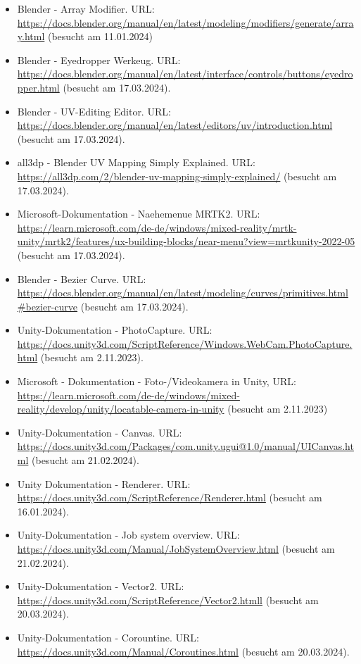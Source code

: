 \begin{itemize}[leftmargin=0pt]
    \item Blender - Array Modifier. {\scriptsize URL:} \url{https://docs.blender.org/manual/en/latest/modeling/modifiers/generate/array.html} (besucht am 11.01.2024)
    \item Blender - Eyedropper Werkeug. {\scriptsize URL:} \url{https://docs.blender.org/manual/en/latest/interface/controls/buttons/eyedropper.html} (besucht am 17.03.2024).
    \item Blender - UV-Editing Editor. {\scriptsize URL:} \url{https://docs.blender.org/manual/en/latest/editors/uv/introduction.html} (besucht am 17.03.2024).
    \item all3dp - Blender UV Mapping Simply Explained. {\scriptsize URL:} \url{https://all3dp.com/2/blender-uv-mapping-simply-explained/} (besucht am 17.03.2024).
    \item Microsoft-Dokumentation - Naehemenue MRTK2. {\scriptsize URL:} \url{https://learn.microsoft.com/de-de/windows/mixed-reality/mrtk-unity/mrtk2/features/ux-building-blocks/near-menu?view=mrtkunity-2022-05} (besucht am 17.03.2024).
    \item Blender - Bezier Curve. {\scriptsize URL:} \url{https://docs.blender.org/manual/en/latest/modeling/curves/primitives.html#bezier-curve} (besucht am 17.03.2024).
    \item Unity-Dokumentation - PhotoCapture. {\scriptsize URL:}  \url{https://docs.unity3d.com/ScriptReference/Windows.WebCam.PhotoCapture.html} (besucht am 2.11.2023).
    \item Microsoft - Dokumentation - Foto-/Videokamera in Unity, {\scriptsize URL:} \url{https://learn.microsoft.com/de-de/windows/mixed-reality/develop/unity/locatable-camera-in-unity} (besucht am 2.11.2023)
    \item Unity-Dokumentation -  Canvas. {\scriptsize URL:} \url{https://docs.unity3d.com/Packages/com.unity.ugui@1.0/manual/UICanvas.html} (besucht am 21.02.2024).
    \item Unity Dokumentation - Renderer. {\scriptsize URL:} \url{https://docs.unity3d.com/ScriptReference/Renderer.html} (besucht am 16.01.2024).
    \item Unity-Dokumentation - Job system overview. {\scriptsize URL:} \url{https://docs.unity3d.com/Manual/JobSystemOverview.html} (besucht am 21.02.2024).
    \item Unity-Dokumentation - Vector2. {\scriptsize URL:} \url{https://docs.unity3d.com/ScriptReference/Vector2.htmll} (besucht am 20.03.2024).
    \item Unity-Dokumentation - Corountine. {\scriptsize URL:} \url{https://docs.unity3d.com/Manual/Coroutines.html} (besucht am 20.03.2024).

\end{itemize}
